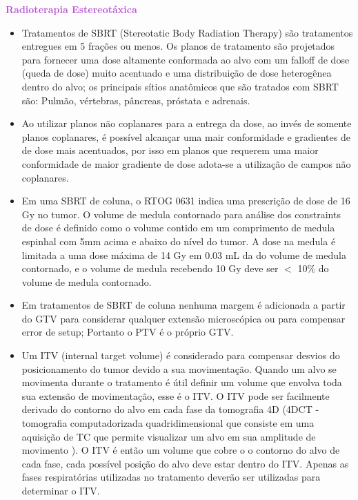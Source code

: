 \documentclass[11pt,a4paper]{article}
\newcounter{exemplo}
\begin{document}
\begin{exemplo}
\begin{itemize}
    \end{itemize}

    \textcolor{MediumOrchid}{\LobsterTwo\textbf{Radioterapia Estereotáxica}}
    \begin{itemize}
        \item Tratamentos de SBRT (Stereotatic Body Radiation Therapy) são tratamentos entregues em 5 frações ou menos. Os planos de tratamento são projetados para fornecer uma dose altamente conformada ao alvo com um falloff de dose (queda de dose) muito acentuado e uma distribuição de dose heterogênea dentro do alvo; os principais sítios anatômicos que são tratados com SBRT são: Pulmão, vértebras, pâncreas, próstata e adrenais.
        
        \item Ao utilizar planos não coplanares para a entrega da dose, ao invés de somente planos coplanares, é possível alcançar uma mair conformidade e gradientes de de dose mais acentuados, por isso em planos que requerem uma maior conformidade de maior gradiente de dose adota-se a utilização de campos não coplanares.
        
        \item Em uma SBRT de coluna, o RTOG 0631 indica uma prescrição de dose de 16 Gy no tumor. O volume de medula contornado para análise dos constraints de dose é definido como o volume contido em um comprimento de medula espinhal com 5mm acima e abaixo do nível do tumor. A dose na medula é limitada a uma dose máxima de 14 Gy em 0.03 mL da do volume de medula contornado, e o volume de medula recebendo 10 Gy deve ser $<$ 10\% do volume de medula contornado. 
        
        \item Em tratamentos de SBRT de coluna nenhuma margem é adicionada a partir do GTV para considerar qualquer extensão microscópica ou para compensar error de setup; Portanto o PTV é o próprio GTV.
        
        \item Um ITV (internal target volume) é considerado para compensar desvios do posicionamento do tumor devido a sua movimentação. Quando um alvo se movimenta durante o tratamento é útil definir um volume que envolva toda sua extensão de movimentação, esse é o ITV. O ITV pode ser facilmente derivado do contorno do alvo em cada fase da tomografia 4D (4DCT - tomografia computadorizada quadridimensional que consiste em uma aquisição de TC que permite visualizar um alvo em sua amplitude de movimento ). O ITV é então um volume que cobre o o contorno do alvo de cada fase, cada possível posição do alvo deve estar dentro do ITV. Apenas as fases respiratórias utilizadas no tratamento deverão ser utilizadas para determinar o ITV.
        

\end{itemize}
\end{exemplo}
\end{document}
